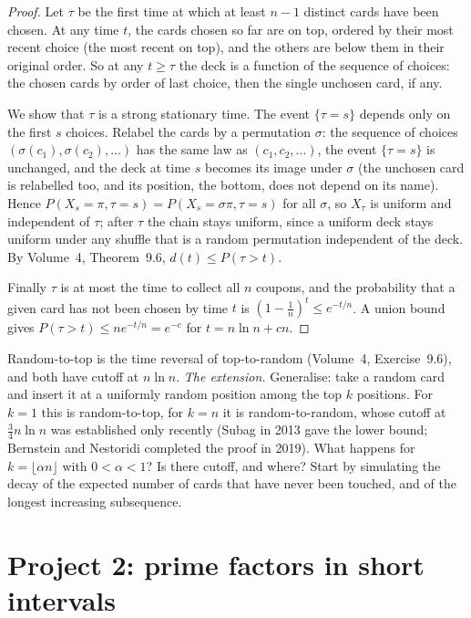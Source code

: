 \begin{proof}
Let $\tau$ be the first time at which at least $n-1$ distinct cards have been chosen. At any time $t$, the cards chosen so far are on top, ordered by their most recent choice (the most recent on top), and the others are below them in their original order. So at any $t\ge\tau$ the deck is a function of the sequence of choices: the chosen cards by order of last choice, then the single unchosen card, if any.

We show that $\tau$ is a strong stationary time. The event $\{\tau=s\}$ depends only on the first $s$ choices. Relabel the cards by a permutation $\sigma$: the sequence of choices $(\sigma(c_1),\sigma(c_2),\dots)$ has the same law as $(c_1,c_2,\dots)$, the event $\{\tau=s\}$ is unchanged, and the deck at time $s$ becomes its image under $\sigma$ (the unchosen card is relabelled too, and its position, the bottom, does not depend on its name). Hence $P(X_s=\pi,\tau=s)=P(X_s=\sigma\pi,\tau=s)$ for all $\sigma$, so $X_\tau$ is uniform and independent of $\tau$; after $\tau$ the chain stays uniform, since a uniform deck stays uniform under any shuffle that is a random permutation independent of the deck. By Volume~4, Theorem~9.6, $d(t)\le P(\tau>t)$.

Finally $\tau$ is at most the time to collect all $n$ coupons, and the probability that a given card has not been chosen by time $t$ is $(1-\frac1n)^t\le e^{-t/n}$. A union bound gives $P(\tau>t)\le ne^{-t/n}=e^{-c}$ for $t=n\ln n+cn$.
\end{proof}

Random-to-top is the time reversal of top-to-random (Volume~4, Exercise~9.6), and both have cutoff at $n\ln n$. \emph{The extension.} Generalise: take a random card and insert it at a uniformly random position among the top $k$ positions. For $k=1$ this is random-to-top, for $k=n$ it is random-to-random, whose cutoff at $\frac34n\ln n$ was established only recently (Subag in 2013 gave the lower bound; Bernstein and Nestoridi completed the proof in 2019). What happens for $k=\lfloor\alpha n\rfloor$ with $0<\alpha<1$? Is there cutoff, and where? Start by simulating the decay of the expected number of cards that have never been touched, and of the longest increasing subsequence.

\section{Project 2: prime factors in short intervals}

